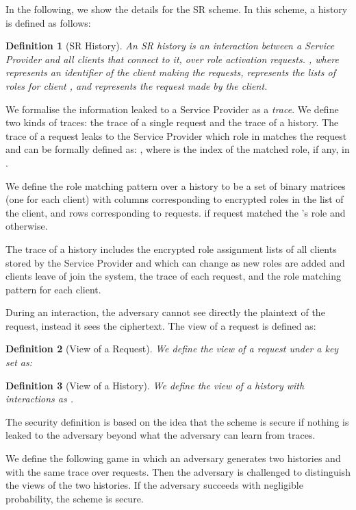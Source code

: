 \documentclass[epsfig,a4paper,11pt,titlepage]{book}
\newtheorem{definition}{Definition}
\numberwithin{algorithm}{chapter}
\begin{document}
In the following, we show the details for the \gls{SR} scheme. In this scheme, a history is defined as follows:

\begin{definition}[\gls{SR} History]
An \gls{SR} history  is an interaction between a Service Provider and all clients that connect to it, over  role activation requests.  , where  represents an identifier of the client making the requests,  represents the lists of roles for client , and  represents the request made by the client.
\end{definition}

We formalise the information leaked to a Service Provider as a \textit{trace}. We define two kinds of traces: the trace of a single request and the trace of a history. The trace of a request leaks to the Service Provider which role in  matches the request and can be formally defined as: , where  is the index of the matched role, if any, in .

We define the role matching pattern  over a history  to be a set of  binary matrices (one for each client) with columns corresponding to encrypted roles in the list of the client, and rows corresponding to requests.  if request  matched the 's role and  otherwise.

The trace of a history includes the encrypted role assignment lists of all clients  stored by the Service Provider and which can change as new roles are added and clients leave of join the system, the trace of each request, and the role matching pattern  for each client.

During an interaction, the adversary cannot see directly the plaintext of the request, instead it sees the ciphertext. The view of a request is defined as:

\begin{definition}[View of a Request]
We define the view of a request  under a key set  as: 

\end{definition}

\begin{definition}[View of a History]
We define the view of a history with  interactions  as 
.
\end{definition}

The security definition is based on the idea that the scheme is secure if nothing is leaked to the adversary beyond what the adversary can learn from traces.

We define the following game in which an adversary  generates two histories  and  with the same trace over  requests. Then the adversary is challenged to distinguish the views of the two histories. If the adversary succeeds with negligible probability, the scheme is secure.
\end{document}
